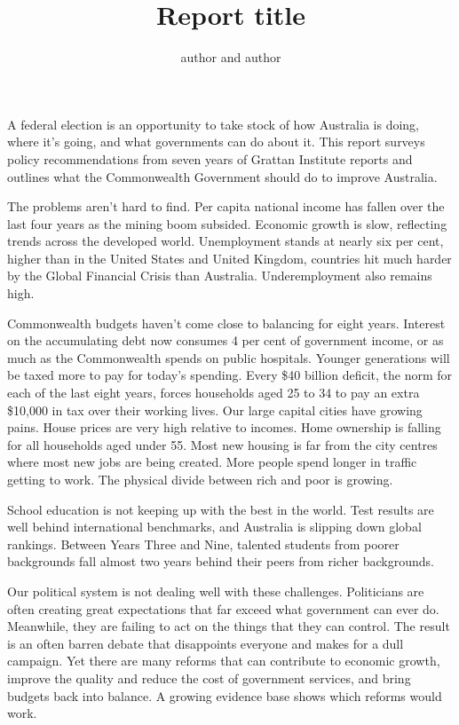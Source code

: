 \documentclass[continuous]{grattan}
\title{Report title}
\author{author and author}
\begin{document}
\contentspage

\listoffigures

\begin{overview}
A federal election is an opportunity to take stock of how Australia
is doing, where it’s going, and what governments can do about it.
This report surveys policy recommendations from seven years of
Grattan Institute reports and outlines what the Commonwealth
Government should do to improve Australia.

The problems aren’t hard to find. Per capita national income has
fallen over the last four years as the mining boom subsided.
Economic growth is slow, reflecting trends across the developed
world. Unemployment stands at nearly six per cent, higher than in
the United States and United Kingdom, countries hit much harder
by the Global Financial Crisis than Australia. Underemployment
also remains high.

Commonwealth budgets haven’t come close to balancing for eight
years. Interest on the accumulating debt now consumes 4 per
cent of government income, or as much as the Commonwealth
spends on public hospitals. Younger generations will be taxed
more to pay for today’s spending. Every \$40 billion deficit, the
norm for each of the last eight years, forces households aged 25
to 34 to pay an extra \$10,000 in tax over their working lives.
Our large capital cities have growing pains. House prices are very
high relative to incomes. Home ownership is falling for all
households aged under 55. Most new housing is far from the city
centres where most new jobs are being created. More people
spend longer in traffic getting to work. The physical divide
between rich and poor is growing.

School education is not keeping up with the best in the world. Test
results are well behind international benchmarks, and Australia is
slipping down global rankings. Between Years Three and Nine,
talented students from poorer backgrounds fall almost two years
behind their peers from richer backgrounds.

Our political system is not dealing well with these challenges.
Politicians are often creating great expectations that far exceed
what government can ever do. Meanwhile, they are failing to act
on the things that they can control. The result is an often barren
debate that disappoints everyone and makes for a dull campaign.
Yet there are many reforms that can contribute to economic
growth, improve the quality and reduce the cost of government
services, and bring budgets back into balance. A growing
evidence base shows which reforms would work.


\end{overview}
\end{document}
